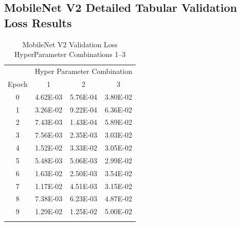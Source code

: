 \documentclass[10pt, conference]{IEEEtran}
\begin{document}


\subsection{MobileNet V2 Detailed Tabular Validation Loss Results} %

\begin{table}[H]
    \centering
    \begin{tabular}{@{}cccc@{}}
        \toprule
        & \multicolumn{3}{c}{Hyper Parameter Combination} \\
        \cmidrule{2-4}
            Epoch  & 1 & 2 & 3\\
        \midrule

        0 & 4.62E-03 & 5.76E-04 & 3.80E-02 \\
        1 & 3.26E-02 & 9.22E-04 & 6.36E-02 \\
        2 & 7.43E-03 & 1.43E-04 & 5.89E-02 \\
        3 & 7.56E-03 & 2.35E-03 & 3.03E-02 \\
        4 & 1.52E-02 & 3.33E-02 & 3.05E-02 \\
        5 & 5.48E-03 & 5.06E-03 & 2.99E-02 \\
        6 & 1.63E-02 & 2.50E-03 & 3.54E-02 \\
        7 & 1.17E-02 & 4.51E-03 & 3.15E-02 \\
        8 & 7.38E-03 & 6.23E-03 & 4.87E-02 \\
        9 & 1.29E-02 & 1.25E-02 & 5.00E-02 \\

        \bottomrule\smallskip
    \end{tabular}
    \caption{MobileNet V2 Validation Loss HyperParameter Combinations 1--3}%
    \label{table:MobileNetV2ValidationLoss1-3}
\end{table}
\end{document}
